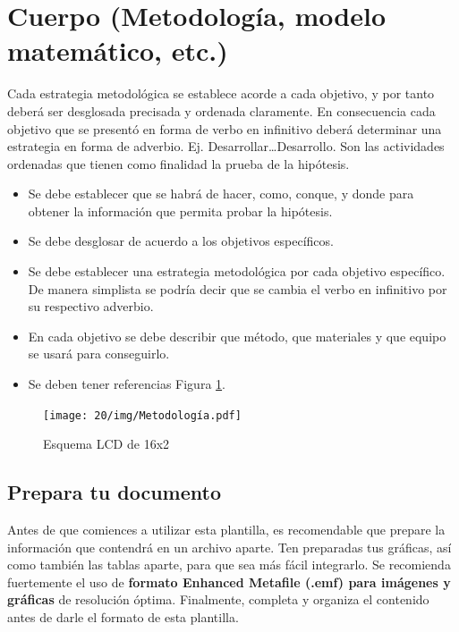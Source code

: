     \section{Cuerpo (Metodología, modelo matemático, etc.)}
    
    Cada estrategia metodológica se establece acorde a cada objetivo, y por tanto deberá ser desglosada precisada y ordenada claramente. En consecuencia cada objetivo que se presentó en forma de verbo en infinitivo deberá determinar una estrategia en forma de adverbio. Ej. Desarrollar…Desarrollo. Son las actividades ordenadas que tienen como finalidad la prueba de la hipótesis. 
    
    \begin{itemize}
        \item Se debe establecer que se habrá de hacer, como, conque, y donde para obtener la información que permita probar la hipótesis.  
        \item Se debe desglosar de acuerdo a los objetivos específicos. 
        \item Se debe establecer una estrategia metodológica por cada objetivo específico. De manera simplista se podría decir que se cambia el verbo en infinitivo por su respectivo adverbio.
        \item En cada objetivo se debe describir que método, que materiales y que equipo se usará para conseguirlo.
        \item Se deben tener referencias Figura \ref{fig:lcd-16x2}.
    \end{itemize}
    \begin{figure}[H]
        \centering
        \texttt{[image: 20/img/Metodología.pdf]}
        \caption{Esquema LCD de 16x2}
        \label{fig:lcd-16x2}
    \end{figure}
    \subsection{Prepara tu documento}
    
    Antes de que comiences a utilizar esta plantilla, es recomendable que prepare la información que contendrá en un archivo aparte. 
    Ten preparadas tus gráficas, así como también las tablas aparte, para que sea más fácil integrarlo. 
    Se recomienda fuertemente el uso de \textbf{formato Enhanced Metafile (.emf) para imágenes y gráficas} de resolución óptima. 
    Finalmente, completa y organiza el contenido antes de darle el formato de esta plantilla. 
    
